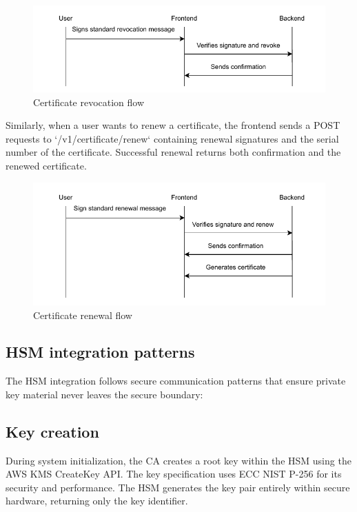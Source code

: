 \begin{figure}[h!]
    \centering
    \includegraphics[keepaspectratio, width=\textwidth]{Pic/revoke_certificate.pdf}
    \caption{Certificate revocation flow}
    \label{fig:certificate-revocation-flow}
\end{figure}
Similarly, when a user wants to renew a certificate, the frontend sends a POST 
requests to `/v1/certificate/renew` containing renewal signatures and the serial number of the 
certificate. Successful renewal returns both confirmation and the renewed certificate.

\begin{figure}[h!]
    \centering
    \includegraphics[keepaspectratio, width=\textwidth]{Pic/renew_certificate.pdf}
    \caption{Certificate renewal flow}
    \label{fig:certificate-renewal-flow}
\end{figure}

\subsection{HSM integration patterns}

The HSM integration follows secure communication patterns 
that ensure private key material never leaves the secure boundary:

\subsection{Key creation}
During system initialization, the CA creates a root key 
within the HSM using the AWS KMS CreateKey API. The key specification uses 
ECC NIST P-256 for its security and performance. The HSM generates the key 
pair entirely within secure hardware, returning only the key identifier.

